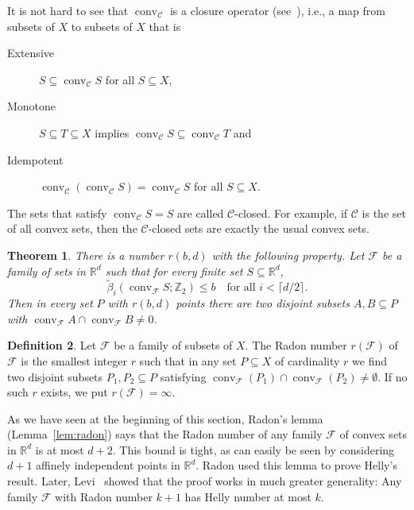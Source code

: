 \documentclass[a4paper,12pt]{amsart}
\newcommand{\R}{\mathbb{R}} 	%
\newcommand{\Z}{\mathbb{Z}} 	%
\newcommand{\F}{\mathcal{F}} 	%
\newtheorem{theorem}{Theorem}
\theoremstyle{definition}
\newtheorem{definition}[theorem]{Definition}
\begin{document}
It is not hard to see that $\operatorname{conv}_{\mathcal C}$ is a closure operator (see~\cite{vanDeVel}),
i.e., a map from subsets of $X$ to subsets of $X$ that is 
\begin{description}
\item[Extensive] $S\subseteq \operatorname{conv}_{\mathcal C}S$ for all $S\subseteq X$,
\item[Monotone] $S\subseteq T\subseteq X$ implies $\operatorname{conv}_{\mathcal C}S\subseteq \operatorname{conv}_{\mathcal C}T$ and
\item[Idempotent] $\operatorname{conv}_{\mathcal C}(\operatorname{conv}_{\mathcal C}S)=\operatorname{conv}_{\mathcal C}S$ for all $S\subseteq X$.
\end{description}
The sets that satisfy $\operatorname{conv}_{\mathcal C}S=S$ are called $\mathcal C$-closed.
For example, if $\mathcal C$ is the set of all convex sets, then the $\mathcal C$-closed sets are exactly the usual convex sets.


\begin{theorem}\cite{bettiRadon}\label{t:bettiRadon}
There is a number $r(b,d)$
 with the following property. Let $\mathcal F$ be a family of sets in $\R^d$ such that 
 for every finite set $S\subseteq \R^d$,
 \[\widetilde{\beta}_i(\operatorname{conv}_{\mathcal F}S;\Z_2)\leq b\quad \text{for all }i< \lceil d/2\rceil.\]
 Then in every set $P$ with $r(b,d)$ points there are two disjoint subsets $A,B\subseteq P$ with $\operatorname{conv}_{\mathcal F}A\cap \operatorname{conv}_{\mathcal F}B\neq 0$. 
\end{theorem}

\begin{definition}\cite{Levi1951, bettiRadon}
Let $\mathcal F$ be a family of subsets of $X$. The Radon number $r(\F)$ of $\mathcal F$ is the smallest integer $r$ such that in any set $P\subseteq X$ of cardinality $r$ we find two disjoint subsets $P_1, P_2 \subseteq P$ satisfying $\operatorname{conv}_{\mathcal F}(P_1)\cap \operatorname{conv}_{\mathcal F}(P_2)\neq \emptyset$.
If no such $r$ exists, we put $r(\F) = \infty$.
\end{definition}

As we have seen at the beginning of this section, Radon's lemma (Lemma~\ref{lem:radon}) says that the Radon number of any family $\F$ of convex sets in $\R^d$ is at most $d+2$. This bound is tight, as can easily be seen by considering $d+1$ affinely independent points in $\R^d$.
Radon used this lemma to prove Helly's result. Later, Levi~\cite{Levi1951} showed that the proof works in much greater generality: Any family $\F$ with Radon number $k+1$ has Helly number at most $k$.
\end{document}
